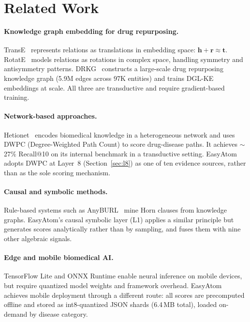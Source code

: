 \documentclass[11pt]{article}
\begin{document}
\section{Related Work}
\label{sec:related}

\paragraph{Knowledge graph embedding for drug repurposing.}
TransE~\cite{bordes2013translating} represents relations as translations
in embedding space: $\mathbf{h} + \mathbf{r} \approx \mathbf{t}$.
RotatE~\cite{sun2018rotate} models relations as rotations in complex space,
handling symmetry and antisymmetry patterns.
DRKG~\cite{drkg2020} constructs a large-scale drug repurposing knowledge graph
(5.9M edges across 97K entities) and trains DGL-KE embeddings at scale.
All three are transductive and require gradient-based training.

\paragraph{Network-based approaches.}
Hetionet~\cite{himmelstein2017systematic} encodes biomedical knowledge in a
heterogeneous network and uses DWPC (Degree-Weighted Path Count) to score
drug-disease paths. It achieves ${\sim}$27\% Recall@10 on its internal
benchmark in a transductive setting.
EasyAtom adopts DWPC at Layer~8 (Section~\ref{sec:l8}) as one of ten
evidence sources, rather than as the sole scoring mechanism.

\paragraph{Causal and symbolic methods.}
Rule-based systems such as AnyBURL~\cite{meilicke2019anyburl} mine
Horn clauses from knowledge graphs.
EasyAtom's causal symbolic layer (L1) applies a similar principle
but generates scores analytically rather than by sampling, and fuses
them with nine other algebraic signals.

\paragraph{Edge and mobile biomedical AI.}
TensorFlow Lite and ONNX Runtime enable neural inference on mobile devices,
but require quantized model weights and framework overhead.
EasyAtom achieves mobile deployment through a different route:
all scores are precomputed offline and stored as int8-quantized
JSON shards (6.4\,MB total), loaded on-demand by disease category.
\end{document}
